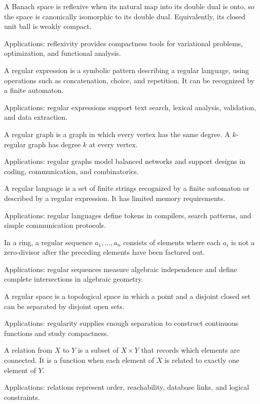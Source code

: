 A Banach space is reflexive when its natural map into its double dual is onto, so the space is canonically isomorphic to its double dual. Equivalently, its closed unit ball is weakly compact. \par\noindent Applications: reflexivity provides compactness tools for variational problems, optimization, and functional analysis.

A regular expression is a symbolic pattern describing a regular language, using operations such as concatenation, choice, and repetition. It can be recognized by a finite automaton. \par\noindent Applications: regular expressions support text search, lexical analysis, validation, and data extraction.

A regular graph is a graph in which every vertex has the same degree. A $k$-regular graph has degree $k$ at every vertex. \par\noindent Applications: regular graphs model balanced networks and support designs in coding, communication, and combinatorics.

A regular language is a set of finite strings recognized by a finite automaton or described by a regular expression. It has limited memory requirements. \par\noindent Applications: regular languages define tokens in compilers, search patterns, and simple communication protocols.

In a ring, a regular sequence $a_1,\ldots,a_n$ consists of elements where each $a_i$ is not a zero-divisor after the preceding elements have been factored out. \par\noindent Applications: regular sequences measure algebraic independence and define complete intersections in algebraic geometry.

A regular space is a topological space in which a point and a disjoint closed set can be separated by disjoint open sets. \par\noindent Applications: regularity supplies enough separation to construct continuous functions and study compactness.

A relation from $X$ to $Y$ is a subset of $X\times Y$ that records which elements are connected. It is a function when each element of $X$ is related to exactly one element of $Y$. \par\noindent Applications: relations represent order, reachability, database links, and logical constraints.

